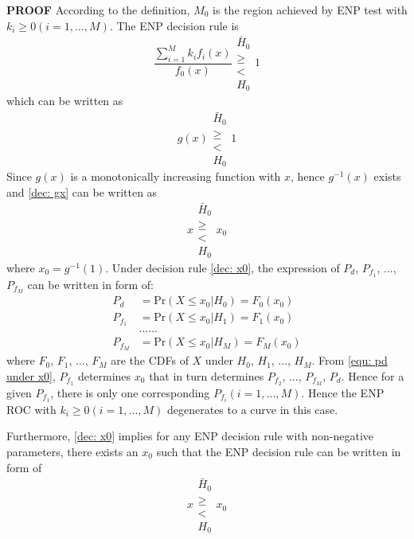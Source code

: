 \noindent \textbf{PROOF}
According to the definition, $M_0$ is the region achieved by ENP test with $k_i \geq 0 (i=1, ..., M)$. The ENP decision rule is
\begin{equation}
\frac{\sum_{i=1}^{M}k_if_i(x)}{f_0(x)} \substack{\bar{H}_0 \\\geq\\< \\H_0}1
\end{equation}
which can be written as
\begin{equation}
\label{dec: gx}
g(x)\substack{\bar{H}_0 \\\geq\\< \\H_0}1
\end{equation}
Since $g(x)$ is a monotonically increasing function with $x$, hence $g^{-1}(x)$ exists and \eqref{dec: gx} can be written as 
\begin{equation}
\label{dec: x0}
x\substack{\bar{H}_0 \\\geq\\< \\H_0}x_0
\end{equation}
where $x_0 = g^{-1}(1)$.
Under decision rule \eqref{dec: x0}, the expression of $P_d$, $P_{f_1}$, ..., $P_{f_M}$ can be written in form of: 
\begin{equation}
\begin{split}
\label{equ: pd under x0}
P_d &= \text{Pr}(X \leq x_0 | H_0) = F_0(x_0)\\
P_{f_1} &= \text{Pr}(X \leq x_0 | H_1) = F_1(x_0)\\
  &......\\
P_{f_M} &= \text{Pr}(X \leq x_0 | H_M) = F_M(x_0)
\end{split}
\end{equation}
where $F_0$, $F_1$, ..., $F_M$ are the CDFs of $X$ under $H_0$, $H_1$, ..., $H_M$. From \eqref{equ: pd under x0}, $P_{f_1}$ determines $x_0$ that in turn determines $P_{f_2}$, ..., $P_{f_M}$, $P_d$. Hence for a given $P_{f_1}$, there is only one corresponding $P_{f_i} (i= 1, ..., M)$. Hence the ENP ROC with $k_i \geq 0 (i = 1, ..., M)$ degenerates to a curve in this case.

Furthermore, \eqref{dec: x0}  implies for any ENP decision rule with non-negative parameters, there exists an $x_0$ such that the ENP decision rule can be written in form of 
\begin{equation}
\label{1125 dec: x0}
x\substack{\bar{H}_0 \\\geq\\< \\H_0}x_0
\end{equation}

